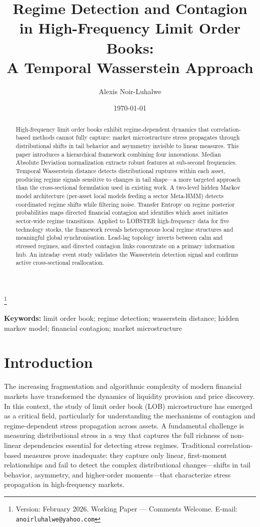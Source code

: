 \documentclass{article}
\title{Regime Detection and Contagion in High-Frequency Limit Order Books:\\
A Temporal Wasserstein Approach}
\author{Alexis Noir-Luhalwe}
\date{\today}
\newcommand\blfootnote[1]{%
  \begingroup
  \renewcommand\thefootnote{}\footnote{#1}%
  \addtocounter{footnote}{-1}%
  \endgroup
}
\begin{document}
\maketitle
\blfootnote{Version: February 2026. Working Paper --- Comments Welcome. E-mail: \texttt{anoirluhalwe@yahoo.com}}

\begin{abstract}
High-frequency limit order books exhibit regime-dependent dynamics that
correlation-based methods cannot fully capture: market microstructure stress
propagates through distributional shifts in tail behavior and asymmetry
invisible to linear measures. This paper introduces a hierarchical framework
combining four innovations. Median Absolute Deviation normalization extracts
robust features at sub-second frequencies. Temporal Wasserstein distance
detects distributional ruptures within each asset, producing regime signals
sensitive to changes in tail shape---a more targeted approach than the
cross-sectional formulation used in existing work. A two-level hidden Markov
model architecture (per-asset local models feeding a sector Meta-HMM) detects
coordinated regime shifts while filtering noise. Transfer Entropy on regime
posterior probabilities maps directed financial contagion and identifies which
asset initiates sector-wide regime transitions. Applied to LOBSTER
high-frequency data for five technology stocks, the framework reveals
heterogeneous local regime structures and meaningful global synchronisation.
Lead-lag topology inverts between calm and stressed regimes, and directed
contagion links concentrate on a primary information hub. An intraday event
study validates the Wasserstein detection signal and confirms active
cross-sectional reallocation.
\end{abstract}

\textbf{Keywords:} limit order book; regime detection; wasserstein distance;
hidden markov model; financial contagion; market microstructure

\section{Introduction}
\label{sec:intro}

The increasing fragmentation and algorithmic complexity of modern financial
markets have transformed the dynamics of liquidity provision and price
discovery. In this context, the study of limit order book (LOB) microstructure
has emerged as a critical field, particularly for understanding the mechanisms
of contagion and regime-dependent stress propagation across assets. A
fundamental challenge is measuring distributional stress in a way that captures
the full richness of non-linear dependencies essential for detecting stress
regimes. Traditional correlation-based measures prove inadequate: they capture
only linear, first-moment relationships and fail to detect the complex
distributional changes---shifts in tail behavior, asymmetry, and higher-order
moments---that characterize stress propagation in high-frequency markets.
\end{document}
